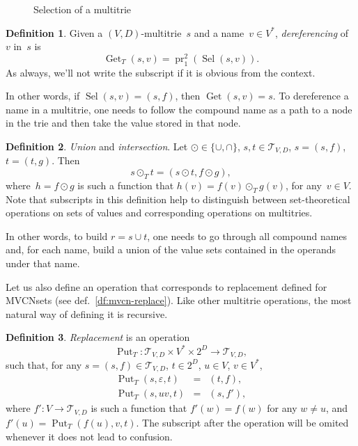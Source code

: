 \documentclass{article}
\theoremstyle{definition}
\newtheorem{Df}{Definition}
\newcommand{\setcharmt}{T}
\newcommand{\setsymbol}[3]{\mathcal{#1}_{#2,#3}}
\newcommand{\setmt}[2]{\setsymbol{\setcharmt}{#1}{#2}}
\newcommand{\select}{\operatorname{Sel}}
\newcommand{\deref}{\operatorname{Get}}
\newcommand{\putval}{\operatorname{Put}}
\newcommand{\proj}[2]{\operatorname{pr}^{#1}_{#2}}
\begin{document}
\begin{figure}[ht]
\begin{center}
\begin{minipage}{17em}
\end{minipage}
\end{center}
\caption{Selection of a multitrie}\label{fig:mt-select}
\end{figure}

\begin{Df}\label{df:mt-deref}
Given a $(V,D)$-multitrie~$s$ and a name~$v\in V^\ast$, \emph{dereferencing}
of~$v$ in~$s$ is
\[
  \deref_\setcharmt(s, v) = \proj{2}{1}(\select(s, v)) .
\]
As always, we'll not write the subscript if it is obvious from the context.
\end{Df}

In other words, if $\select(s,v) = (s,f)$, then $\deref(s, v) = s$. To
dereference a name in a multitrie, one needs to follow the compound name
as a path to a node in the trie and then take the value stored in that node.

\begin{Df}\label{df:mt-setop}
\emph{Union} and \emph{intersection}.
Let $\odot \in \{ \cup, \cap \}$, $s, t \in \setmt{V}{D}$,
$s = (s, f)$, $t = (t, g)$. Then
\[
  s \odot_\setcharmt  t = (s \odot t, f \odot g) ,
\]
where~$h = f \odot g$ is such a function that
$h(v) = f(v) \odot_\setcharmt  g(v)$,
for any~$v \in V$.
Note that subscripts in this definition help to distinguish between
set-theoretical operations on sets of values and corresponding operations
on multitries.
\end{Df}

In other words, to build $r = s \cup t$, one needs to go through all compound
names and, for each name, build a union of the value sets contained in the
operands under that name.

Let us also define an operation that corresponds to replacement
defined for MVCNsets (see def.~\ref{df:mvcn-replace}). Like other multitrie
operations, the most natural way of defining it is recursive.

\begin{Df}\label{df:mt-replace}
\emph{Replacement} is an operation
\[
  \putval_\setcharmt : \setmt{V}{D} \times V^\ast \times 2^D \to \setmt{V}{D},
\]
such that, for any
$s = (s, f) \in \setmt{V}{D}$, $t \in 2^D$, $u \in V$, $v \in V^\ast$,
\begin{eqnarray*}
  \putval_\setcharmt(s, \varepsilon, t) & = & (t, f) , \\
  \putval_\setcharmt(s, u v, t) & = & (s, f') ,
\end{eqnarray*}
where $f' : V \to \setmt{V}{D}$ is such a function that $f'(w) = f(w)$ for any
$w\neq u$, and $f'(u) = \putval_\setcharmt(f(u), v, t)$.
The subscript after the operation will be omited whenever it does not lead to
confusion.
\end{Df}
\end{document}
